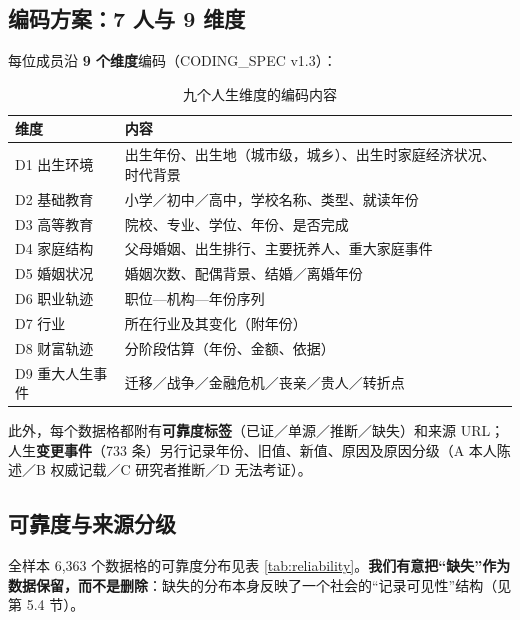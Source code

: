 \documentclass[UTF8,a4paper,11pt]{ctexart}
\begin{document}
\subsection{编码方案：7 人与 9 维度}

每位成员沿 \textbf{9 个维度}编码（CODING\_SPEC v1.3）：

\begin{table}[htbp]
\centering
\caption{九个人生维度的编码内容}
\label{tab:dims}
\small
\begin{tabular}{@{}lp{11cm}@{}}
\toprule
维度 & 内容 \\
\midrule
D1 出生环境 & 出生年份、出生地（城市级，城乡）、出生时家庭经济状况、时代背景 \\
D2 基础教育 & 小学／初中／高中，学校名称、类型、就读年份 \\
D3 高等教育 & 院校、专业、学位、年份、是否完成 \\
D4 家庭结构 & 父母婚姻、出生排行、主要抚养人、重大家庭事件 \\
D5 婚姻状况 & 婚姻次数、配偶背景、结婚／离婚年份 \\
D6 职业轨迹 & 职位—机构—年份序列 \\
D7 行业 & 所在行业及其变化（附年份） \\
D8 财富轨迹 & 分阶段估算（年份、金额、依据） \\
D9 重大人生事件 & 迁移／战争／金融危机／丧亲／贵人／转折点 \\
\bottomrule
\end{tabular}
\end{table}

此外，每个数据格都附有\textbf{可靠度标签}（已证／单源／推断／缺失）和来源 URL；人生\textbf{变更事件}（733 条）另行记录年份、旧值、新值、原因及原因分级（A 本人陈述／B 权威记载／C 研究者推断／D 无法考证）。

\subsection{可靠度与来源分级}
\label{sec:reliability}

全样本 6{,}363 个数据格的可靠度分布见表 \ref{tab:reliability}。\textbf{我们有意把“缺失”作为数据保留，而不是删除}：缺失的分布本身反映了一个社会的“记录可见性”结构（见第 5.4 节）。
\end{document}
